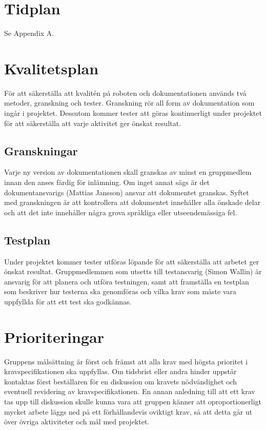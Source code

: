 \documentclass[a4paper,12pt]{article}
\begin{document}
\section{Tidplan}
Se  Appendix A.


\section{Kvalitetsplan}	%
För att säkerställa att kvalitén på roboten och dokumentationen används två metoder, granskning och tester. Granskning rör all form av dokumentation som ingår i projektet. Dessutom kommer tester att göras kontinuerligt under projektet för att säkerställa att varje aktivitet ger önskat resultat.
\subsection{Granskningar}
Varje ny version av dokumentationen skall granskas av minst en gruppmedlem innan den anses färdig för inlämning. Om inget annat sägs är det dokumentansvarigs (Mattias Jansson) ansvar att dokumentet granskas. Syftet med granskningen är att kontrollera att dokumentet innehåller alla önskade delar och att det inte innehåller några grova språkliga eller utseendemässiga fel.

\subsection{Testplan}
Under projektet kommer tester utföras löpande för att säkerställa att arbetet ger önskat resultat. Gruppmedlemmen som utsetts till testansvarig (Simon Wallin) är ansvarig för att planera och utföra testningen, samt att framställa en testplan som beskriver hur testerna ska genomföras och vilka krav som måste vara uppfyllda för att ett test ska godkännas.



\section{Prioriteringar}
Gruppens målsättning är först och främst att alla krav med högsta prioritet i kravspecifikationen ska uppfyllas. Om tidsbrist eller andra hinder uppstår kontaktas först beställaren för en diskussion om kravets nödvändighet och eventuell revidering av kravspecifikationen. En annan anledning till att ett krav tas upp till diskussion skulle kunna vara att gruppen känner att oproportionerligt mycket arbete läggs ned på ett förhållandevis oviktigt krav, så att detta går ut över övriga aktiviteter och mål med projektet.
\end{document}
